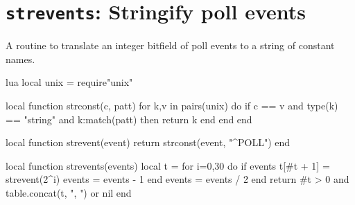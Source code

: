\documentclass[11pt, oneside]{memoir}
\newcommand*{\fn}[1]{\texttt{#1}\xspace}
\begin{document}
\clearpage

\section[\fn{strevents}]{\fn{strevents}: Stringify poll events}

\label{setevents}

A routine to translate an integer bitfield of poll events to a string of constant names.

\begin{example}{lua}
local unix = require"unix"

local function strconst(c, patt)
  for k,v in pairs(unix) do
    if c == v and type(k) == "string" and k:match(patt) then
      return k
    end
  end
end

local function strevent(event)
  return strconst(event, "^POLL")
end

local function strevents(events)
  local t = {}
  for i=0,30 do
    if events %
      t[#t + 1] = strevent(2^i)
      events = events - 1
    end
    events = events / 2
  end
  return #t > 0 and table.concat(t, ", ") or nil
end
\end{example}

\clearpage

%
%
%
%
%
%
%
%
%


\appendix
\printindex
\end{document}
